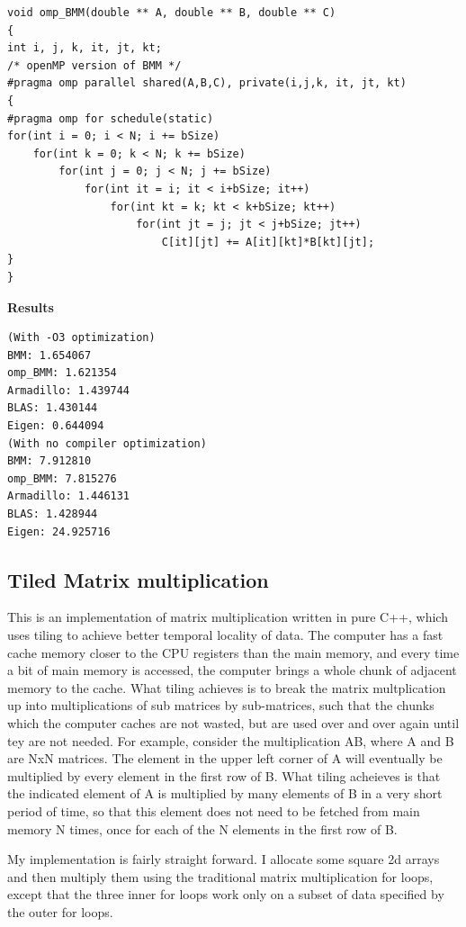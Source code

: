 \begin{center}
\begin{lstlisting}
void omp_BMM(double ** A, double ** B, double ** C)
{
int i, j, k, it, jt, kt;
/* openMP version of BMM */
#pragma omp parallel shared(A,B,C), private(i,j,k, it, jt, kt)
{
#pragma omp for schedule(static)
for(int i = 0; i < N; i += bSize)
	for(int k = 0; k < N; k += bSize)
		for(int j = 0; j < N; j += bSize)
			for(int it = i; it < i+bSize; it++)
				for(int kt = k; kt < k+bSize; kt++)
					for(int jt = j; jt < j+bSize; jt++)
						C[it][jt] += A[it][kt]*B[kt][jt];
}
}

\end{lstlisting}
\textbf{Results}
\begin{lstlisting}
(With -O3 optimization)
BMM: 1.654067
omp_BMM: 1.621354 
Armadillo: 1.439744
BLAS: 1.430144
Eigen: 0.644094
(With no compiler optimization)
BMM: 7.912810
omp_BMM: 7.815276 
Armadillo: 1.446131
BLAS: 1.428944
Eigen: 24.925716

\end{lstlisting}
\end{center}

\subsection{Tiled Matrix multiplication}
This is an implementation of matrix multiplication written in pure C++, which uses tiling to achieve better temporal locality of data. The computer has a fast cache memory closer to the CPU registers than the main memory, and every time a bit of main memory is accessed, the computer brings a whole chunk of adjacent memory to the cache. What tiling achieves is to break the matrix multplication up into multiplications of sub matrices by sub-matrices, such that the chunks which the computer caches are not wasted, but are used over and over again until tey are not needed. For example, consider the multiplication AB, where A and B are NxN matrices. The element in the upper left corner of A will eventually be multiplied by every element in the first row of B. What tiling acheieves is that the indicated element of A is multiplied by many elements of B in a very short period of time, so that this element does not need to be fetched from main memory N times, once for each of the N elements in the first row of B.

My implementation is fairly straight forward. I allocate some square 2d arrays and then multiply them using the traditional matrix multiplication for loops, except that the three inner for loops work only on a subset of data specified by the outer for loops.

